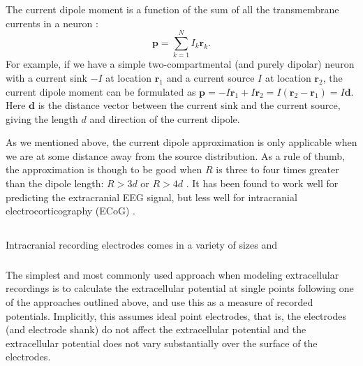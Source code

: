 The current dipole moment is a function of the sum of all the transmembrane currents in a neuron \citep{Pettersen2008, Pettersen2014, Nunez2006}: 
\begin{equation}\label{VC:eq:dipole}
\mathbf{p} = \sum_{k=1}^N I_k \mathbf{r}_k.
\end{equation}
For example, if we have a simple two-compartmental (and purely dipolar) neuron with a current sink $-I$ at location $\mathbf{r}_1$ and a current source $I$ at location $\mathbf{r}_2$, the current dipole moment can be formulated as $\mathbf{p} = -I\mathbf{r}_1 + I\mathbf{r}_2 = I(\mathbf{r}_2 - \mathbf{r}_1) = I\mathbf{d}$. Here $\mathbf{d}$ is the distance vector between the current sink and the current source, giving the length $d$ and direction of the current dipole. 

As we mentioned above, the current dipole approximation is only applicable when we are at some distance away from the source distribution. As a rule of thumb, the approximation is though to be good when $R$ is three to four times greater than the dipole length: $R > 3d$ or $R > 4d$ \citep{Nunez2006}. It has been found to work well for predicting the extracranial EEG signal, but less well for intracranial electrocorticography (ECoG) \citep{naess2020biophysical}.


\subsection{}
\label{sec:VC:electrodes}

Intracranial recording electrodes comes in a variety of sizes and 

\subsubsection{}
The simplest and most commonly used approach when modeling extracellular recordings is to calculate the extracellular potential at single points following one of the approaches outlined above, and use this as a measure of recorded potentials. Implicitly, this assumes ideal point electrodes, that is, the electrodes (and electrode shank) do not affect the extracellular potential and the extracellular potential does not vary substantially over the surface of the electrodes.

